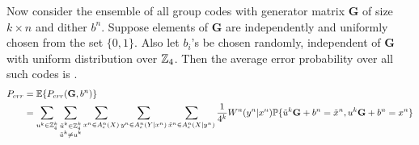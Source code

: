 \documentclass[11pt]{article}
\theoremstyle{plain}
\theoremstyle{definition}
\theoremstyle{remark}
\begin{document}
Now consider the ensemble of all group codes with generator matrix $\mathbf{G}$ of size $k \times n$ and dither $b^n$. Suppose elements of $\mathbf{G}$  are independently and uniformly chosen from the set $\{ 0,1\}$. Also let $b_i$'s be chosen randomly, independent of $\mathbf{G}$ with uniform distribution over $\mathbb{Z}_4$. Then the average error probability over all such codes is
.
\begin{align}\label{equ: p_err}
P_{err}&=\mathbb{E}\{ P_{err}(\mathbf{G},b^n) \}\\
&=\sum_{u^k\in \mathbb{Z}_4^k} \sum_{\substack{\tilde{u}^k \in \mathbb{Z}_4^k \\\tilde{u}^k\neq u^k}} \sum_{x^n\in A_\epsilon^n(X)} \sum_{y^n\in A_\epsilon^n(Y|x^n)} \sum_{\tilde{x}^n\in A_\epsilon^n(X|y^n)} \frac{1}{4^k} W^n(y^n|x^n) \mathbb{P}\{ \tilde{u}^k\mathbf{G}+b^n=\tilde{x}^n, u^k \mathbf{G}+b^n=x^n\}
\end{align}
\end{document}

